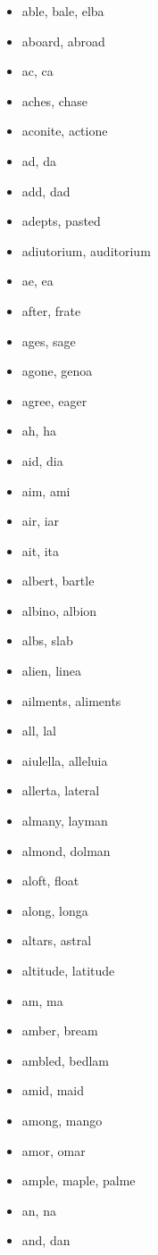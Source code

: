 \documentclass[a4wide,11pt]{report}
\begin{document}
\noindent 
\twocolumn
\begin{itemize}
  \item able, bale, elba
  \item aboard, abroad
  \item ac, ca
  \item aches, chase
  \item aconite, actione
  \item ad, da
  \item add, dad
  \item adepts, pasted
  \item adiutorium, auditorium
  \item ae, ea
  \item after, frate
  \item ages, sage
  \item agone, genoa
  \item agree, eager
  \item ah, ha
  \item aid, dia
  \item aim, ami
  \item air, iar
  \item ait, ita
  \item albert, bartle
  \item albino, albion
  \item albs, slab
  \item alien, linea
  \item ailments, aliments
  \item all, lal
  \item aiulella, alleluia
  \item allerta, lateral
  \item almany, layman
  \item almond, dolman
  \item aloft, float
  \item along, longa
  \item altars, astral
  \item altitude, latitude
  \item am, ma
  \item amber, bream
  \item ambled, bedlam
  \item amid, maid
  \item among, mango
  \item amor, omar
  \item ample, maple, palme
  \item an, na
  \item and, dan

\end{itemize}
\end{document}
